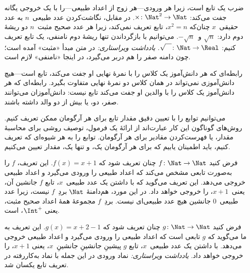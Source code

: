\documentclass[../../../include/open-logic-section]{subfiles}
\begin{document}
\begin{ex}
ضرب یک تابع است، زیرا هر ورودی---هر زوج
از اعداد طبیعی---را با یک خروجی یگانه جفت می‌کند: $\times \colon \Nat^2 \to
\Nat$. در مقابل، نگاشت‌کردن عدد طبیعی~$n$ به عدد حقیقی~$x$ چنان‌که
$x^2 = n$، تابع تعریف نمی‌کند، زیرا هر عدد صحیح مثبت~$n$ دو
ریشهٔ دوم دارد: $\sqrt{n}$ و~$-\sqrt{n}$. می‌توانیم با
بازگرداندن تنها ریشهٔ دوم نامنفی، یک تابع تعریف کنیم: $\sqrt{\phantom{X}} \colon
\Nat \to \Real$.
\emph{یادداشت ویراستاری:} در متن مبدأ «مثبت» آمده است؛ چون دامنه صفر را هم دربر می‌گیرد، در اینجا «نامنفی» لازم است.
\end{ex}

\begin{ex}
رابطه‌ای که هر دانش‌آموز یک کلاس را با نمرهٔ نهایی او جفت می‌کند،
تابع است---هیچ دانش‌آموزی نمی‌تواند در همان
کلاس دو نمرهٔ نهایی متفاوت بگیرد. رابطه‌ای که هر دانش‌آموز یک کلاس را با
والدین او جفت می‌کند تابع نیست: دانش‌آموزان می‌توانند صفر، دو، یا بیش از
دو والد داشته باشند.
\end{ex}

\begin{explain}
می‌توانیم توابع را با تعیین دقیق مقدار تابع برای
هر آرگومان ممکن تعریف کنیم. روش‌های گوناگون این کار عبارت‌اند از
ارائهٔ یک فرمول، توصیف روشی برای محاسبهٔ
مقدار، یا فهرست‌کردن مقادیر برای هر آرگومان. توابع را به هر شیوه‌ای که
تعریف کنیم، باید اطمینان یابیم که برای هر آرگومان یک،
و تنها یک، مقدار تعیین می‌کنیم.
\end{explain}


\begin{ex}
فرض کنید $f \colon \Nat \to \Nat$ چنان تعریف شود که $f(x) = x+1$. این
تعریف، $f$ را به‌صورت تابعی مشخص می‌کند که
اعداد طبیعی را ورودی می‌گیرد و اعداد طبیعی خروجی می‌دهد. این تعریف می‌گوید که با داشتن یک
عدد طبیعی~$x$، تابع $f$ جانشین آن، یعنی~$x+1$، را خروجی خواهد داد.
در این مورد، هم‌دامنهٔ $\Nat$ بردِ~$f$ نیست، زیرا
عدد طبیعی~$0$ جانشین هیچ عدد طبیعی‌ای نیست.
بردِ~$f$ مجموعهٔ همهٔ اعداد صحیح مثبت، یعنی $\Int^{+}$، است.
\end{ex}

\begin{ex}
فرض کنید $g \colon \Nat \to \Nat$ چنان تعریف شود که $g(x) = x+2-1$. این
تعریف به ما می‌گوید که $g$ تابعی است که اعداد طبیعی را ورودی می‌گیرد و
اعداد طبیعی خروجی می‌دهد. با داشتن یک عدد طبیعی~$x$، تابع $g$
پیشینِ جانشینِ جانشینِ~$x$، یعنی
$x+1$، را خروجی خواهد داد.
\emph{یادداشت ویراستاری:} نماد ورودی در این جمله با نماد به‌کاررفته در تعریف تابع یکسان شد.
\end{ex}
\end{document}
